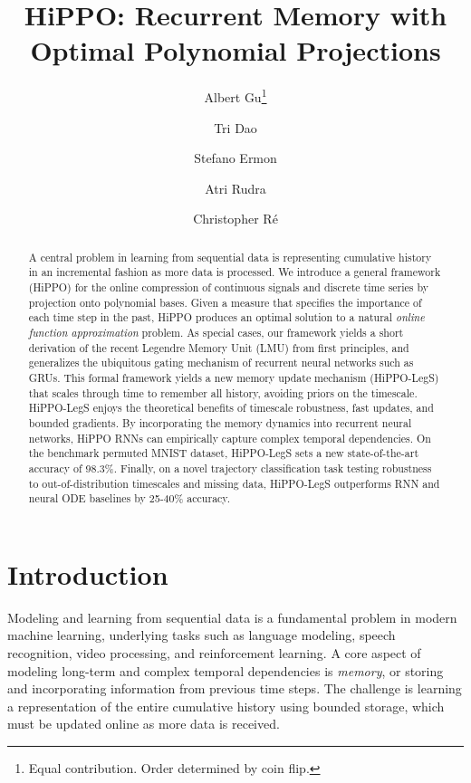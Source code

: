 \documentclass{article}
\title{HiPPO: Recurrent Memory with Optimal Polynomial Projections}
\author[$\dagger$]{Albert Gu\thanks{Equal contribution. Order determined by coin flip.}}
\author[$\dagger$]{Tri Dao\samethanks}
\author[$\dagger$]{Stefano Ermon}
\author[$\ddagger$]{Atri Rudra}
\author[$\dagger$]{Christopher R{\'e}}
\affil[$\dagger$]{Department of Computer Science, Stanford University}
\affil[$\ddagger$]{Department of Computer Science and Engineering, University at Buffalo, SUNY\vspace{4pt}}
\affil[ ]{{\texttt{\{albertgu,trid\}@stanford.edu}, \texttt{ermon@cs.stanford.edu}, \texttt{atri@buffalo.edu}, \texttt{chrismre@cs.stanford.edu}}}
\begin{document}
\maketitle

\begin{abstract}
  A central problem in learning from sequential data is representing cumulative
  history in an incremental fashion as more data is processed.
  We introduce a general framework (HiPPO) for the online compression of continuous signals and discrete time series
  by projection onto polynomial bases.
  Given a measure that specifies the importance of each time step in the past,
  HiPPO produces an optimal solution to a natural \emph{online function approximation} problem.
  As special cases, our framework yields a short derivation of the recent Legendre Memory Unit (LMU) from first principles,
  and generalizes the ubiquitous gating mechanism of recurrent neural networks such as GRUs.
  This formal framework yields a new memory update mechanism (HiPPO-LegS) that scales
  through time to remember all history, avoiding priors on the timescale.
  HiPPO-LegS enjoys the theoretical benefits of timescale robustness, fast updates,
  and bounded gradients.
  By incorporating the memory dynamics into recurrent neural networks, HiPPO RNNs can
  empirically capture complex temporal dependencies.
  On the benchmark permuted MNIST dataset, HiPPO-LegS sets a new
  state-of-the-art accuracy of 98.3\%.
  Finally, on a novel trajectory classification task testing robustness to out-of-distribution timescales and missing data, HiPPO-LegS outperforms RNN and neural ODE baselines by 25-40\% accuracy.
\end{abstract}




\section{Introduction}
\label{sec:intro}

  Modeling and learning from sequential data is a fundamental problem in
  modern machine learning, underlying tasks such as language modeling, speech
  recognition, video processing, and reinforcement learning.
  A core aspect of modeling long-term and complex temporal dependencies is \emph{memory}, or
  storing and incorporating information from previous time steps.
  The challenge is learning a representation of the entire cumulative history using bounded storage,
  which must be updated online as more data is received.
  
\end{document}
